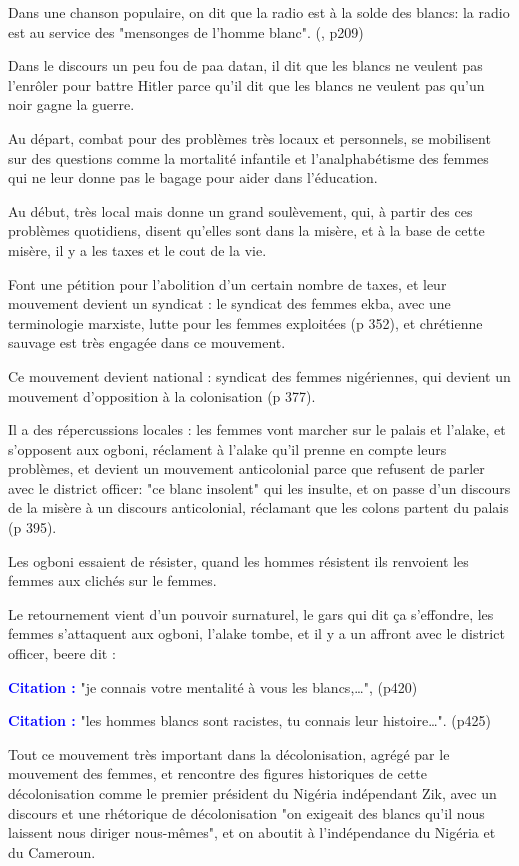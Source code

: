 \documentclass[a4paper, 11pt, hidelinks]{article}
\newcommand{\bs}{\bigskip}
\newcommand{\cit}{\large \textcolor{blue}{\textbf{Citation :}} \large }
\newcommand{\rb}[1]{\Romanbar{#1}}
\begin{document}
Dans une chanson populaire, on dit que la radio est à la solde des blancs: la radio est au service
des "mensonges de l'homme blanc". (\rb{7}, p209)


Dans le discours un peu fou de paa datan, il dit que les blancs ne veulent pas l'enrôler pour battre
Hitler parce qu'il dit que les blancs ne veulent pas qu'un noir gagne la guerre.

\bs

Au départ, combat pour des problèmes très locaux et personnels, se mobilisent sur des questions comme
la mortalité infantile et l'analphabétisme des femmes qui ne leur donne pas le bagage pour aider dans
l'éducation.
\bs

Au début, très local mais donne un grand soulèvement, qui, à partir des ces problèmes
quotidiens, disent qu'elles sont dans la misère, et à la base de cette misère, il y a les taxes et le
cout de la vie.


Font une pétition pour l'abolition d'un certain nombre de taxes, et leur mouvement
devient un syndicat : le syndicat des femmes ekba, avec une terminologie marxiste, lutte pour les
femmes exploitées (p 352), et chrétienne sauvage est très engagée dans ce mouvement.


Ce mouvement devient national : syndicat des femmes nigériennes, qui devient un mouvement d'opposition à
la colonisation (p 377).
\bs


Il a des répercussions locales : les femmes vont marcher sur le palais et l'alake, et s'opposent aux
ogboni, réclament à l'alake qu'il prenne en compte leurs problèmes, et devient un mouvement anticolonial
parce que refusent de parler avec le district officer: "ce blanc insolent" qui les insulte, et on passe
d'un discours de la misère à un discours anticolonial, réclamant que les colons partent du palais (p 395).


Les ogboni essaient de résister, quand les hommes résistent ils renvoient les femmes aux clichés sur le
femmes.
\bs


Le retournement vient d'un pouvoir surnaturel, le gars qui dit ça s'effondre, les femmes
s'attaquent aux ogboni, l'alake tombe, et il y a un affront avec le district officer, beere dit :


\cit "je connais votre mentalité à vous les blancs,…", (p420)


\cit "les hommes blancs sont racistes, tu connais leur histoire…". (p425)
\bs

Tout ce mouvement très important dans la décolonisation, agrégé par le mouvement des
femmes, et rencontre des figures historiques de cette décolonisation comme le premier président du
Nigéria indépendant Zik, avec un discours et une rhétorique de décolonisation "on exigeait des blancs
qu'il nous laissent nous diriger nous-mêmes", et on aboutit à l'indépendance du Nigéria et du Cameroun.
\end{document}
